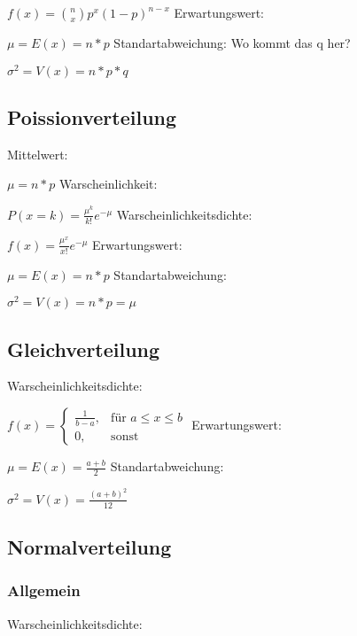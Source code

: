 \documentclass[a4paper, 11pt]{article}
\begin{document}
$f(x) = \binom{n}{x} p^x(1-p)^{n-x}$
\newline\newline Erwartungswert:

$\mu = E(x) = n * p$
\newline\newline Standartabweichung:
Wo kommt das q her?

$\sigma^2 = V(x)= n * p * q$
\subsection{Poissionverteilung}
Mittelwert:

$\mu = n * p$
\newline\newline Warscheinlichkeit:

$P(x=k) = \frac{\mu^k} {k!} e^{-\mu}$
\newline\newline Warscheinlichkeitsdichte:

$f(x) = \frac{\mu^x} {x!} e^{-\mu}$
\newline\newline Erwartungswert:

$\mu = E(x) = n * p$
\newline\newline Standartabweichung:

$\sigma^2 = V(x)= n * p = \mu $
\subsection{Gleichverteilung}
Warscheinlichkeitsdichte:

$f(x) = \begin {cases}
  \frac{1} {b-a}, & \text {für } a\le x \le b \\
  0, & \text{sonst}
\end{cases} $
\newline\newline Erwartungswert:

$ \mu = E(x) = \frac { a + b } {2}$
\newline\newline Standartabweichung:

$\sigma^2 = V(x)= \frac {(a + b)^2 } {12} $
\subsection{Normalverteilung}

\subsubsection{Allgemein}
Warscheinlichkeitsdichte: 
\end{document}
